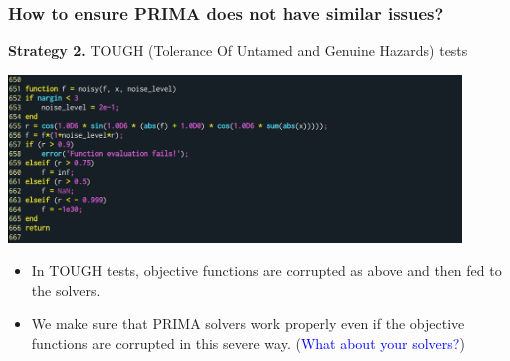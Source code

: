 \documentclass[slidestop,mathserif,xcolor=dvipsnames]{beamer}
\newcommand{\blue}[1]{\textcolor{blue}{#1}}
\begin{document}
\begin{frame}
    \frametitle{How to ensure PRIMA does not have similar issues? }

    \textbf{Strategy 2.} TOUGH (Tolerance Of Untamed and Genuine Hazards) tests

    \begin{center}
        \includegraphics[width=0.9\textwidth]{tough.png}
    \end{center}

    \begin{itemize}
        \item In TOUGH tests, objective functions are corrupted as above and then fed to the solvers.
            \vspace{0.5ex}
        \item We make sure that PRIMA solvers work properly even if the objective functions are
            corrupted in this severe way. (\blue{What about your solvers?})
    \end{itemize}
\end{frame}
\end{document}
